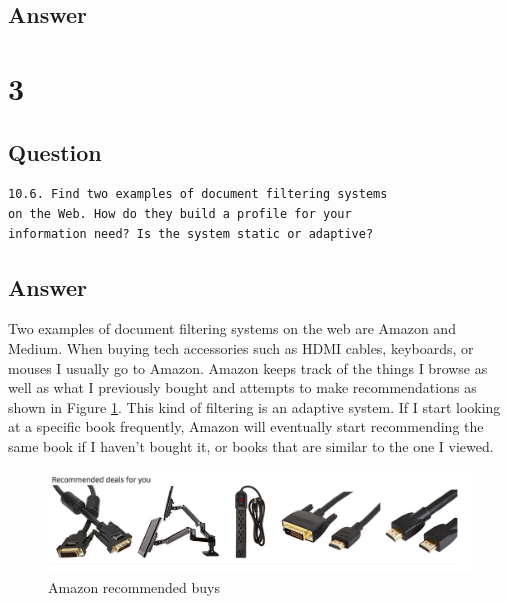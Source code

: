 \documentclass[letterpaper,11pt]{article}
\begin{document}
\begin{verbatim}

\end{verbatim}

\subsection*{Answer}



\clearpage


\section*{3}

\subsection*{Question}

\begin{verbatim}
10.6. Find two examples of document filtering systems 
on the Web. How do they build a profile for your
information need? Is the system static or adaptive?
\end{verbatim}

\subsection*{Answer}

Two examples of document filtering systems on the web are Amazon and Medium.
When buying tech accessories such as HDMI cables, keyboards, or mouses I usually go to Amazon.
Amazon keeps track of the things I browse as well as what I previously bought and attempts to make recommendations as shown in Figure \ref{fig:ama}.
This kind of filtering is an adaptive system.
If I start looking at a specific book frequently, Amazon will eventually start recommending the same book if I haven't bought it, or books that are similar to the one I viewed.

\begin{figure}[h]
\centering
\includegraphics[scale=0.4]{amazon.png}
\caption{Amazon recommended buys}
\label{fig:ama}
\end{figure}
\end{document}
